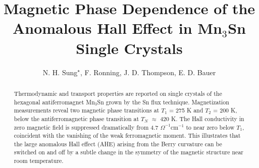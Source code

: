\documentclass[prb,twocolumn,showpacs,preprintnumbers,amsmath,amssymb]{revtex4}
\begin{document}
\title{Magnetic Phase Dependence of the Anomalous Hall Effect in Mn$_3$Sn Single Crystals}

\author{N. H. Sung$^{\star}$, F. Ronning, J. D. Thompson, E. D. Bauer }

\begin{abstract}

Thermodynamic and transport properties are reported on single crystals of the hexagonal antiferromagnet Mn$_3$Sn grown by the Sn flux technique.  Magnetization measurements reveal two magnetic phase transitions at $T_1$ = 275 K and $T_2$ = 200 K, 
below the antiferromagnetic phase transition at $T_N$ $\approx$ 420 K. The Hall conductivity in zero magnetic field is suppressed dramatically from 4.7 $\Omega^{-1}$cm$^{-1}$ to near zero below $T_1$, coincident with the vanishing of the weak ferromagnetic moment. This illustrates that the large anomalous Hall effect (AHE) arising from the Berry curvature can be switched on and off by a subtle change in the symmetry of the magnetic structure near room temperature. 




\end{abstract}


\maketitle
\newpage
\end{document}

